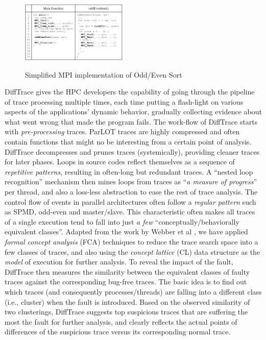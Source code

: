 \begin{figure}[]
\centering
\caption{Simplified MPI implementation of Odd/Even Sort}
\includegraphics[width=0.45\textwidth]{figs/oddEven.png}
\label{fig.oddEven}
\end{figure}

DiffTrace gives the HPC developers the capability of going through the pipeline of trace processing multiple times, each time putting a flash-light on various aspects of the applications' dynamic behavior, gradually collecting evidence about what went wrong that made the program fails.
%
The work-flow of DiffTrace starts with \textit{pre-processing} traces. ParLOT traces are highly compressed and often contain functions that might no be interesting from a certain point of analysis. DiffTrace decompresses and prunes traces (systemically), providing cleaner traces for later phases.  
%
Loops in source codes reflect themselves as a sequence of \textit{repetitive patterns}, resulting in often-long but redundant traces. A ``nested loop  recognition'' mechanism then mines loops from traces as ``\textit{a measure of progress}'' per thread, and also a loss-less abstraction to ease the rest of trace analysis.
%
The control flow of events in parallel architectures often follow a \textit{regular pattern} such as SPMD, odd-even and master/slave. This characteristic often makes all traces of a single execution tend to fall into just \textit{a few} ``conceptually/behaviorally equivalent classes''. Adapted from the work by Webber et al \cite{weberStructural}, we have applied \textit{formal concept analysis} (FCA)\cite{clbook} techniques to reduce the trace search space into a few classes of traces, and also using the \textit{concept lattice} (CL) data structure as the \textit{model} of execution for further analysis.
%
To reveal the impact of the fault, DiffTrace then measures the similarity between the equivalent classes of faulty traces against the corresponding bug-free traces.
%
The basic idea is to find out which traces (and consequently processes/threads) are falling into a different class (i.e., cluster) when the fault is introduced.
%
Based on the observed similarity of two clusterings, DiffTrace suggests top suspicious traces that are suffering the most the fault for further analysis, and clearly reflects the actual points of differences of the suspicious trace versus its corresponding normal trace.
